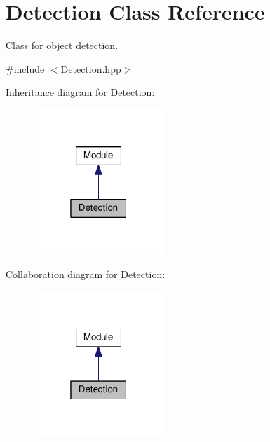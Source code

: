 \hypertarget{class_detection}{}\section{Detection Class Reference}
\label{class_detection}


Class for object detection.  




{\ttfamily \#include $<$Detection.\+hpp$>$}



Inheritance diagram for Detection\+:
\nopagebreak
\begin{figure}[H]
\begin{center}
\leavevmode
\includegraphics[width=139pt]{class_detection__inherit__graph}
\end{center}
\end{figure}


Collaboration diagram for Detection\+:
\nopagebreak
\begin{figure}[H]
\begin{center}
\leavevmode
\includegraphics[width=139pt]{class_detection__coll__graph}
\end{center}
\end{figure}
